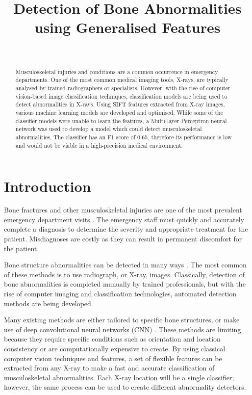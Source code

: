 \documentclass{IEEEtran}
\begin{document}
	
	\title{Detection of Bone Abnormalities using Generalised Features}
	\author{\\
	}
	
	\maketitle
	
	\begin{abstract}
		Musculoskeletal injuries and conditions are a common occurrence in emergency departments. One of the most common medical imaging tools, X-rays, are typically analysed by trained radiographers or specialists. However, with the rise of computer vision-based image classification techniques, classification models are being used to detect abnormalities in X-rays. Using SIFT features extracted from X-ray images, various machine learning models are developed and optimised. While some of the classifier models were unable to learn the features, a Multi-layer Perceptron neural network was used to develop a model which could detect musculoskeletal abnormalities. The classifier has an F1 score of 0.65, therefore its performance is low and would not be viable in a high-precision medical environment.
	\end{abstract}

	\section{Introduction}
	
	Bone fractures and other musculoskeletal injuries are one of the most prevalent emergency department visits \cite{KOZACI201567}. The emergency staff must quickly and accurately complete a diagnosis to determine the severity and appropriate treatment for the patient. Misdiagnoses are costly as they can result in permanent discomfort for the patient.
	
	Bone structure abnormalities can be detected in many ways \cite{medlineplusmedicalencyclopedia2021}. The most common of these methods is to use radiograph, or X-ray, images. Classically, detection of bone abnormalities is completed manually by trained professionals, but with the rise of computer imaging and classification technologies, automated detection methods are being developed.
	
	Many existing methods are either tailored to specific bone structures, or make use of deep convolutional neural networks (CNN) \cite{rajpurkar2017mura, donnelleyandknowles}. These methods are limiting because they require specific conditions such as orientation and location consistency or are computationally expensive to create. By using classical computer vision techniques and features, a set of flexible features can be extracted from any X-ray to make a fast and accurate classification of musculoskeletal abnormalities. Each X-ray location will be a single classifier; however, the same process can be used to create different abnormality detectors.
	
\end{document}
